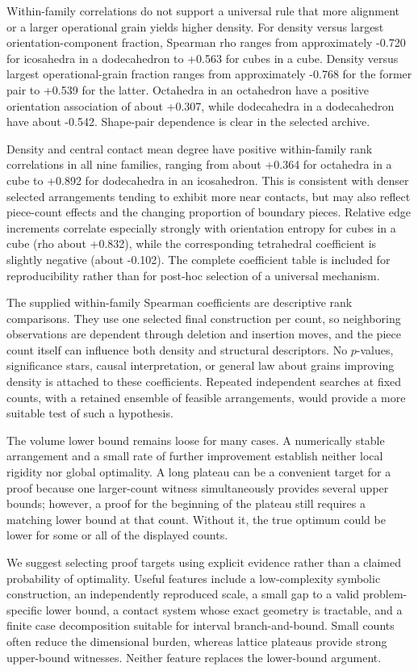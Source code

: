 \documentclass[11pt,a4paper]{article}
\begin{document}
Within-family correlations do not support a universal rule that more alignment or a larger operational grain yields higher density. For density versus largest orientation-component fraction, Spearman rho ranges from approximately -0.720 for icosahedra in a dodecahedron to +0.563 for cubes in a cube. Density versus largest operational-grain fraction ranges from approximately -0.768 for the former pair to +0.539 for the latter. Octahedra in an octahedron have a positive orientation association of about +0.307, while dodecahedra in a dodecahedron have about -0.542. Shape-pair dependence is clear in the selected archive.

Density and central contact mean degree have positive within-family rank correlations in all nine families, ranging from about +0.364 for octahedra in a cube to +0.892 for dodecahedra in an icosahedron. This is consistent with denser selected arrangements tending to exhibit more near contacts, but may also reflect piece-count effects and the changing proportion of boundary pieces. Relative edge increments correlate especially strongly with orientation entropy for cubes in a cube (rho about +0.832), while the corresponding tetrahedral coefficient is slightly negative (about -0.102). The complete coefficient table is included for reproducibility rather than for post-hoc selection of a universal mechanism.

The supplied within-family Spearman coefficients are descriptive rank comparisons. They use one selected final construction per count, so neighboring observations are dependent through deletion and insertion moves, and the piece count itself can influence both density and structural descriptors. No $p$-values, significance stars, causal interpretation, or general law about grains improving density is attached to these coefficients. Repeated independent searches at fixed counts, with a retained ensemble of feasible arrangements, would provide a more suitable test of such a hypothesis.

The volume lower bound remains loose for many cases. A numerically stable arrangement and a small rate of further improvement establish neither local rigidity nor global optimality. A long plateau can be a convenient target for a proof because one larger-count witness simultaneously provides several upper bounds; however, a proof for the beginning of the plateau still requires a matching lower bound at that count. Without it, the true optimum could be lower for some or all of the displayed counts.

We suggest selecting proof targets using explicit evidence rather than a claimed probability of optimality. Useful features include a low-complexity symbolic construction, an independently reproduced scale, a small gap to a valid problem-specific lower bound, a contact system whose exact geometry is tractable, and a finite case decomposition suitable for interval branch-and-bound. Small counts often reduce the dimensional burden, whereas lattice plateaus provide strong upper-bound witnesses. Neither feature replaces the lower-bound argument.
\end{document}
